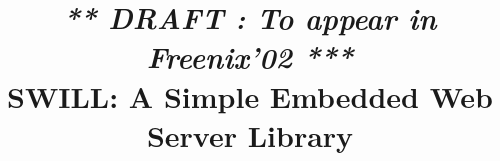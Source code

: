 
\setlength{\textheight}{9.0in}
\setlength{\columnsep}{0.25in}
\setlength{\textwidth}{6.45in}
\setlength{\footheight}{0.0in}
\setlength{\topmargin}{0.0in}
\setlength{\headheight}{0.0in}
\setlength{\headsep}{0.0in}
\setlength{\oddsidemargin}{0in}


\makeatletter
\def\@normalsize{\@setsize\normalsize{12pt}\xpt\@xpt
\abovedisplayskip 10pt plus2pt minus5pt\belowdisplayskip \abovedisplayskip
\abovedisplayshortskip \z@ plus3pt\belowdisplayshortskip 6pt plus3pt
minus3pt\let\@listi\@listI} 

\def\subsize{\@setsize\subsize{12pt}\xipt\@xipt}

\def\section{\@startsection {section}{1}{\z@}{24pt plus 2pt minus 2pt}
{12pt plus 2pt minus 2pt}{\large\bf}}

\def\subsection{\@startsection {subsection}{2}{\z@}{12pt plus 2pt minus 2pt}
{12pt plus 2pt minus 2pt}{\subsize\bf}}
\makeatother

\newcommand{\ignore}[1]{}



\date{}

\title{
{\large \em *** DRAFT : To appear in Freenix'02 ***} \\
{\Large \bf   SWILL: A Simple Embedded Web Server Library}}


